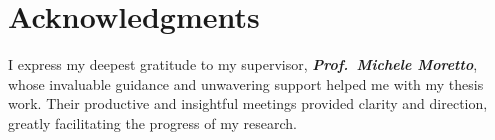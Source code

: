 \chapter*{Acknowledgments}

I express my deepest gratitude to my supervisor, \textbf{\textit{Prof.\ Michele Moretto}}, whose invaluable guidance and unwavering support helped me with my thesis work. Their productive and insightful meetings provided clarity and direction, greatly facilitating the progress of my research.

